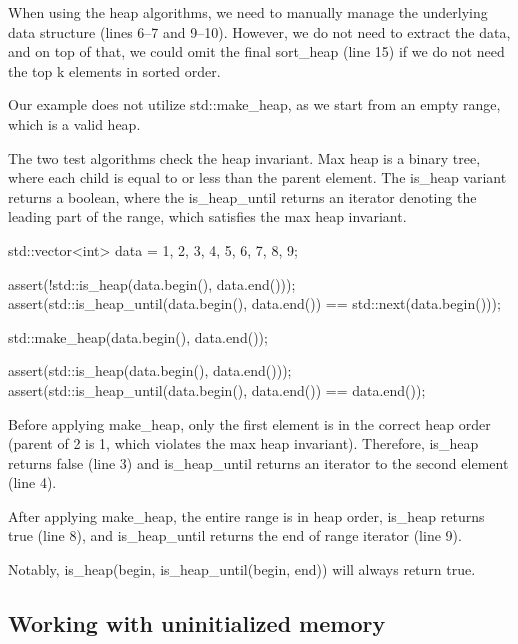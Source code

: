 When using the heap algorithms, we need to manually manage the underlying data structure (lines 6–7 and 9–10). However, we do not need to extract the data, and on top of that, we could omit the final sort\_heap (line 15) if we do not need the top k elements in sorted order.

Our example does not utilize std::make\_heap, as we start from an empty range, which is a valid heap.



The two test algorithms check the heap invariant. Max heap is a binary tree, where each child is equal to or less than the parent element. The is\_heap variant returns a boolean, where the is\_heap\_until returns an iterator denoting the leading part of the range, which satisfies the max heap invariant.

\begin{box-note}
\begin{cppcode}
std::vector<int> data = {1, 2, 3, 4, 5, 6, 7, 8, 9};

assert(!std::is_heap(data.begin(), data.end()));
assert(std::is_heap_until(data.begin(), data.end()) == std::next(data.begin()));

std::make_heap(data.begin(), data.end());

assert(std::is_heap(data.begin(), data.end()));
assert(std::is_heap_until(data.begin(), data.end()) == data.end());
\end{cppcode}
\end{box-note}

Before applying make\_heap, only the first element is in the correct heap order (parent of 2 is 1, which violates the max heap invariant). Therefore, is\_heap returns false (line 3) and is\_heap\_until returns an iterator to the second element (line 4).

After applying make\_heap, the entire range is in heap order, is\_heap returns true (line 8), and is\_heap\_until returns the end of range iterator (line 9).

Notably, is\_heap(begin, is\_heap\_until(begin, end)) will always return true.

\subsection{Working with uninitialized memory}

